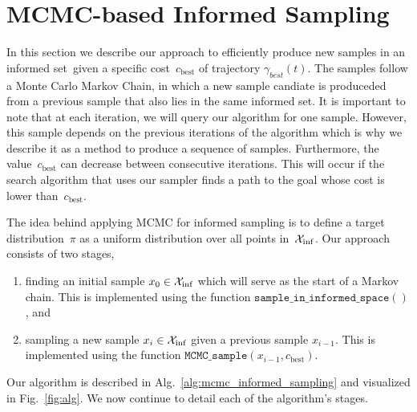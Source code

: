 \documentclass[letterpaper, 10 pt, conference]{ieeeconf}  %
\begin{document}
\section{MCMC-based Informed Sampling}
\label{sec:algorithm}

In this section we describe our approach to efficiently produce new samples in an informed set~\Cinf given a specific cost~$c_{\text{best}}$ of trajectory $\gamma_{best}(t)$.
The samples follow a Monte Carlo Markov Chain, in which a new sample candiate is produceded from a previous sample that also lies in the same informed set.
It is important to note that at each iteration, we will query our algorithm for one sample. 
However, this sample depends on the previous iterations of the algorithm which is why we describe it as a method to produce a sequence of samples.
Furthermore, the value~$c_{\text{best}}$ can decrease between consecutive iterations.
This will occur if the search algorithm that uses our sampler finds a path to the goal whose cost is lower than~$c_{\text{best}}$.

The idea behind applying MCMC for informed sampling is to define a target distribution~$ \pi $ as a uniform distribution over all points in~$ \mathcal{X}_{\rm {inf}} $.
Our approach consists of two stages,
\begin{enumerate}
	\item finding an initial sample $ x_0 \in \mathcal{X}_{\rm {inf}} $ which will serve as the start of a Markov chain. This is implemented using the function 
	$ \texttt{sample\_in\_informed\_space}( )$, and
	\item sampling a new sample $ x_i \in \mathcal{X}_{\rm {inf}} $ given a previous sample $ x_{i-1} $. This is implemented using the function $\texttt{MCMC\_sample} (x_{i-1}, c_{\text{best}})$.
\end{enumerate}

%
Our algorithm is described in Alg.~\ref{alg:mcmc_informed_sampling} and visualized in Fig.~\ref{fig:alg}.
We now continue to detail each of the algorithm's stages.
\end{document}
